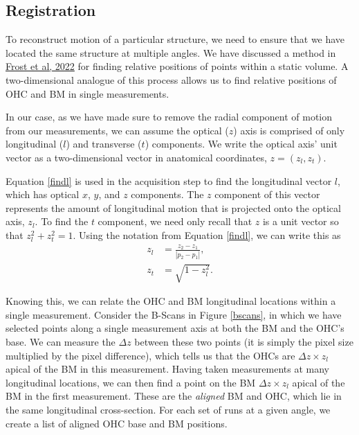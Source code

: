 \documentclass{article}
\begin{document}
\subsection{Registration}
\par{To reconstruct motion of a particular structure, we need to ensure that we have located the same structure at multiple angles. We have discussed a method in \href{https://asa.scitation.org/doi/full/10.1121/10.0009576}{Frost et al, 2022} for finding relative positions of points within a static volume. A two-dimensional analogue of this process allows us to find relative positions of OHC and BM in single measurements.}
\par{In our case, as we have made sure to remove the radial component of motion from our measurements, we can assume the optical ($z$) axis is comprised of only longitudinal ($l$) and transverse ($t$) components. We write the optical axis' unit vector as a two-dimensional vector in anatomical coordinates, $z = (z_l,z_t)$.}
\par{Equation \ref{findl} is used in the acquisition step to find the longitudinal vector $l$, which has optical  $x$, $y$, and $z$ components. The $z$ component of this vector represents the amount of longitudinal motion that is projected onto the optical axis, $z_l$. To find the $t$ component, we need only recall that $z$ is a unit vector so that $z_l^2 + z_t^2 = 1$. Using the notation from Equation \ref{findl}, we can write this as
	\begin{align}
		z_l &= \frac{z_2-z_1}{|p_2-p_1|}, \\
		z_t &= \sqrt{1-z_l^2}.
	\end{align}
}
\par{Knowing this, we can relate the OHC and BM longitudinal locations within a single measurement. Consider the B-Scans in Figure \ref{bscans}, in which we have selected points along a single measurement axis at both the BM and the OHC's base. We can measure the $\Delta z$ between these two points (it is simply the pixel size multiplied by the pixel difference), which tells us that the OHCs are $\Delta z \times z_l$ apical of the BM in this measurement. Having taken measurements at many longitudinal locations, we can then find a point on the BM $\Delta z \times z_l$ apical of the BM in the first measurement. These are the \textit{aligned} BM and OHC, which lie in the same longitudinal cross-section. For each set of runs at a given angle, we create a list of aligned OHC base and BM positions.}
\end{document}
